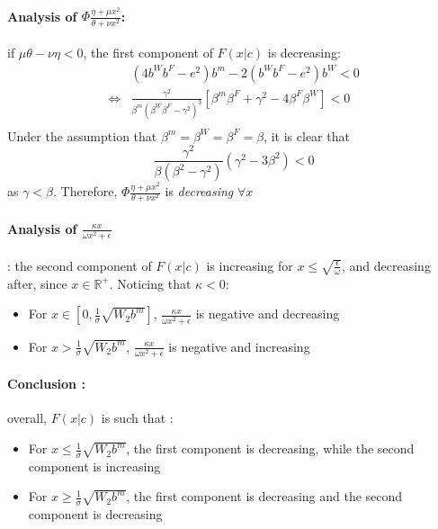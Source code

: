 \paragraph{Analysis of $\Phi \frac{\eta + \mu x^2}{\theta + \nu x^2}$:} if $\mu \theta - \nu \eta<0$, the first component of $F(x|c)$ is decreasing:
\begin{align*}
&(4b^Wb^F - e^2)b^m -2(b^Wb^F-e^2)b^W<0\\
\iff & \frac{\gamma^2}{\beta^m (\beta^W\beta^F - \gamma^2)^3}\left[ \beta^m \beta^F + \gamma^2 -4\beta^F \beta^W \right]<0\\
\end{align*}
Under the assumption that $\beta^m = \beta^W = \beta^F = \beta$, it is clear that 
$$
\frac{\gamma^2}{\beta(\beta^2 - \gamma^2)}(\gamma^2 - 3 \beta^2) <0
$$
as $\gamma < \beta$. 
Therefore, $\Phi \frac{\eta + \mu x^2}{\theta + \nu x^2}$ is \textit{decreasing} $\forall x$
\paragraph{Analysis of $\frac{\kappa x}{\omega x^2 + \epsilon}$}: the second component of $F(x|c)$ is increasing for $x \leq \sqrt{\frac{\epsilon}{\omega}}$, and decreasing after, since $x\in \mathbb{R}^+$. Noticing that $\kappa <0$: 
\begin{itemize}
    \item For $x \in \left[0,\frac{1}{\sigma}\sqrt{W_2 b^m} \right]$, $\frac{\kappa x}{\omega x^2 + \epsilon}$ is negative and decreasing
    \item For $x>\frac{1}{\sigma}\sqrt{W_2 b^m}$, $\frac{\kappa x}{\omega x^2 + \epsilon}$ is negative and increasing
\end{itemize}
%
\paragraph{Conclusion :}
overall, $F(x|c)$ is such that : 
\begin{itemize}
    \item For $x \leq \frac{1}{\sigma}\sqrt{W_2 b^m}$, the first component is decreasing, while the second component is increasing
    \item For $x \geq \frac{1}{\sigma}\sqrt{W_2 b^m}$, the first component is decreasing and the second component is decreasing
\end{itemize}

